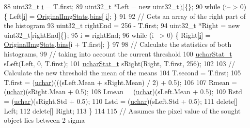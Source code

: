 \begin{DoxyCode}
88             uint32\_t \hyperlink{_comparision_pictures_2_createtest_image_8m_a6f6ccfcf58b31cb6412107d9d5281426}{i} = T.first;
89             uint32\_t *Left = \textcolor{keyword}{new} uint32\_t[\hyperlink{_comparision_pictures_2_createtest_image_8m_a6f6ccfcf58b31cb6412107d9d5281426}{i}]\{\};
90             \textcolor{keywordflow}{while} (i-- > 0) \{ Left[\hyperlink{_comparision_pictures_2_createtest_image_8m_a6f6ccfcf58b31cb6412107d9d5281426}{i}] = \hyperlink{class_vision_1_1_segment_ab35cfe5504de7e5ea327991468e6cf3b}{OriginalImgStats}.\hyperlink{class_soil_math_1_1_stats_a00778b298b1ebb335eb0c4eed69e471c}{bins}[
      \hyperlink{_comparision_pictures_2_createtest_image_8m_a6f6ccfcf58b31cb6412107d9d5281426}{i}]; \}
91 
92             \textcolor{comment}{// Gets an array of the right part of the histogram}
93             uint32\_t rightEnd = 256 - T.first;
94             uint32\_t *Right = \textcolor{keyword}{new} uint32\_t[rightEnd]\{\};
95             i = rightEnd;
96             \textcolor{keywordflow}{while} (i-- > 0) \{ Right[\hyperlink{_comparision_pictures_2_createtest_image_8m_a6f6ccfcf58b31cb6412107d9d5281426}{i}] = \hyperlink{class_vision_1_1_segment_ab35cfe5504de7e5ea327991468e6cf3b}{OriginalImgStats}.\hyperlink{class_soil_math_1_1_stats_a00778b298b1ebb335eb0c4eed69e471c}{bins}[i + T.first]; \}
97 
98             \textcolor{comment}{// Calculate the statistics of both histograms,}
99             \textcolor{comment}{// taking into account the current threshold}
100             \hyperlink{class_soil_math_1_1_stats}{ucharStat\_t} sLeft(Left, 0, T.first);
101             \hyperlink{class_soil_math_1_1_stats}{ucharStat\_t} sRight(Right, T.first, 256);
102 
103             \textcolor{comment}{// Calculate the new threshold the mean of the means}
104             T.second = T.first;
105             T.first = (\hyperlink{_soil_math_types_8h_a65f85814a8290f9797005d3b28e7e5fc}{uchar})(((sLeft.Mean + sRight.Mean) / 2) + 0.5);
106 
107             Rmean = (\hyperlink{_soil_math_types_8h_a65f85814a8290f9797005d3b28e7e5fc}{uchar})(sRight.Mean + 0.5);
108             Lmean = (\hyperlink{_soil_math_types_8h_a65f85814a8290f9797005d3b28e7e5fc}{uchar})(sLeft.Mean + 0.5);
109             Rstd = (\hyperlink{_soil_math_types_8h_a65f85814a8290f9797005d3b28e7e5fc}{uchar})(sRight.Std + 0.5);
110             Lstd = (\hyperlink{_soil_math_types_8h_a65f85814a8290f9797005d3b28e7e5fc}{uchar})(sLeft.Std + 0.5);
111             \textcolor{keyword}{delete}[] Left;
112             \textcolor{keyword}{delete}[] Right;
113         \}
114 
115         \textcolor{comment}{// Assumes the pixel value of the sought object lies between 2 sigma}

\end{DoxyCode}
